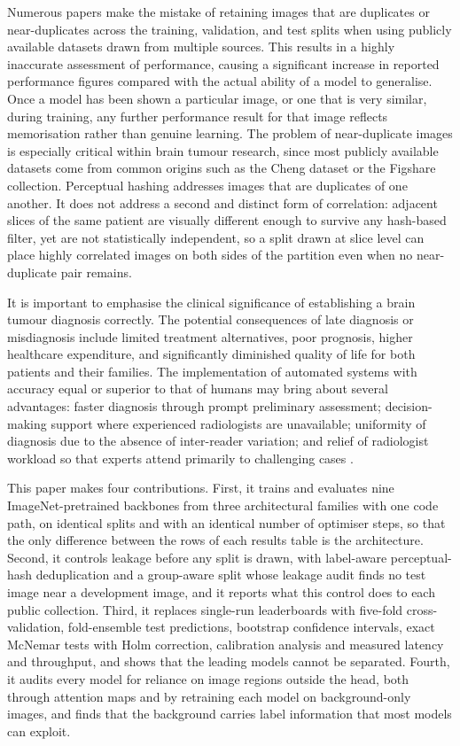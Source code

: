 \documentclass[final,3p,times,number]{elsarticle}
\begin{document}
Numerous papers make the mistake of retaining images that are duplicates or near-duplicates across the training, validation, and test splits when using publicly available datasets drawn from multiple sources. This results in a highly inaccurate assessment of performance, causing a significant increase in reported performance figures compared with the actual ability of a model to generalise. Once a model has been shown a particular image, or one that is very similar, during training, any further performance result for that image reflects memorisation rather than genuine learning. The problem of near-duplicate images is especially critical within brain tumour research, since most publicly available datasets come from common origins such as the Cheng dataset or the Figshare collection. Perceptual hashing addresses images that are duplicates of one another. It does not address a second and distinct form of correlation: adjacent slices of the same patient are visually different enough to survive any hash-based filter, yet are not statistically independent, so a split drawn at slice level can place highly correlated images on both sides of the partition even when no near-duplicate pair remains.

It is important to emphasise the clinical significance of establishing a brain tumour diagnosis correctly. The potential consequences of late diagnosis or misdiagnosis include limited treatment alternatives, poor prognosis, higher healthcare expenditure, and significantly diminished quality of life for both patients and their families. The implementation of automated systems with accuracy equal or superior to that of humans may bring about several advantages: faster diagnosis through prompt preliminary assessment; decision-making support where experienced radiologists are unavailable; uniformity of diagnosis due to the absence of inter-reader variation; and relief of radiologist workload so that experts attend primarily to challenging cases \cite{ref13,ref14}.

This paper makes four contributions. First, it trains and evaluates nine ImageNet-pretrained backbones from three architectural families with one code path, on identical splits and with an identical number of optimiser steps, so that the only difference between the rows of each results table is the architecture. Second, it controls leakage before any split is drawn, with label-aware perceptual-hash deduplication and a group-aware split whose leakage audit finds no test image near a development image, and it reports what this control does to each public collection. Third, it replaces single-run leaderboards with five-fold cross-validation, fold-ensemble test predictions, bootstrap confidence intervals, exact McNemar tests with Holm correction, calibration analysis and measured latency and throughput, and shows that the leading models cannot be separated. Fourth, it audits every model for reliance on image regions outside the head, both through attention maps and by retraining each model on background-only images, and finds that the background carries label information that most models can exploit.
\end{document}
